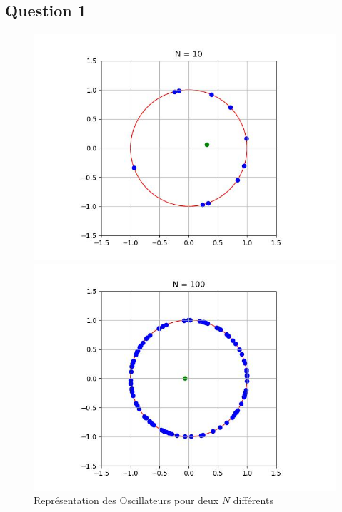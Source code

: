 \documentclass[a4paper, 11pt]{article}
\begin{document}
\subsection*{Question 1}
\begin{figure}[H]
    \begin{minipage}[c]{0.49\linewidth}
        \centering
        \includegraphics[width=\textwidth]{pics/kura1_10.jpg}
    \end{minipage}\hfill
    \begin{minipage}[c]{0.49\linewidth}
        \centering
        \includegraphics[width=\textwidth]{pics/kura1_100.jpg}
    \end{minipage}
    \caption{Représentation des Oscillateurs pour deux $N$ différents}
\end{figure}
\end{document}
